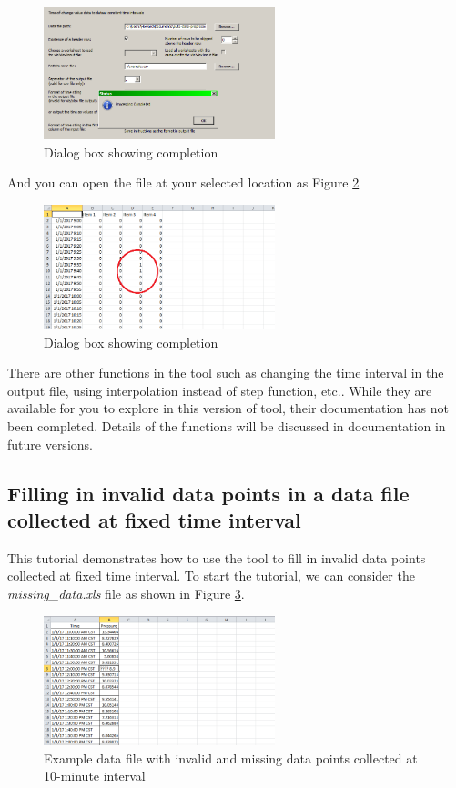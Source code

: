 \documentclass[12pt,a4paper]{article}
\begin{document}
\begin{figure}[H]
\centering
\includegraphics[width=0.6\textwidth]{complete.png}
\caption{Dialog box showing completion}
\label{fig:complete}
\end{figure}

And you can open the file at your selected location as Figure \ref{fig:step}

\begin{figure}[H]
\centering
\includegraphics[width=0.6\textwidth]{step.png}
\caption{Dialog box showing completion}
\label{fig:step}
\end{figure}

There are other functions in the tool such as changing the time interval in the output file, using interpolation instead of step function, etc..
While they are available for you to explore in this version of tool, their documentation has not been completed.
Details of the functions will be discussed in documentation in future versions.

\subsection{Filling in invalid data points in a data file collected at fixed time interval}

This tutorial demonstrates how to use the tool to fill in invalid data points collected at fixed time interval.
To start the tutorial, we can consider the \emph{missing\_data.xls} file as shown in Figure \ref{fig:missing_data}.

\begin{figure}[H]
\centering
\includegraphics[width=0.6\textwidth]{missing_data.png}
\caption{Example data file with invalid and missing data points collected at 10-minute interval}
\label{fig:missing_data}
\end{figure}
\end{document}
